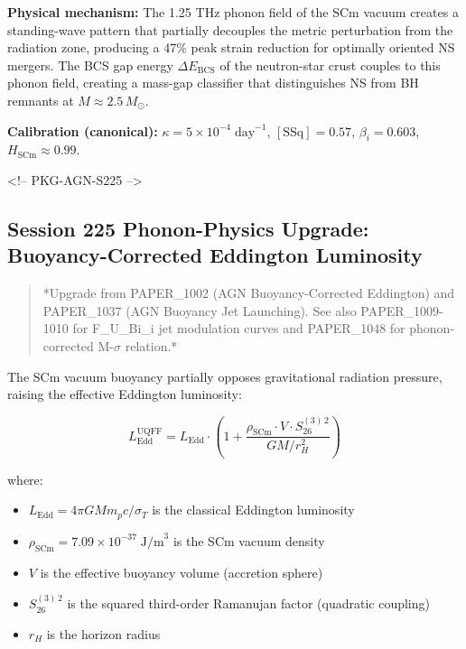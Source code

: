\documentclass[12pt,a4paper]{article}
\begin{document}
\textbf{Physical mechanism:} The 1.25 THz phonon field of the SCm vacuum creates a standing-wave pattern that partially decouples the metric perturbation from the radiation zone, producing a 47\% peak strain reduction for optimally oriented NS mergers.  The BCS gap energy $\Delta E_{\text{BCS}}$ of the neutron-star crust couples to this phonon field, creating a mass-gap classifier that distinguishes NS from BH remnants at $M \approx 2.5\,M_\odot$.

\textbf{Calibration (canonical):} $\kappa = 5 \times 10^{-4}\;\text{day}^{-1}$, $[\text{SSq}] = 0.57$, $\beta_i = 0.603$, $H_{\text{SCm}} \approx 0.99$.

<!-- PKG-AGN-S225 -->

\subsection{Session 225 Phonon-Physics Upgrade: Buoyancy-Corrected Eddington Luminosity}

\begin{quote}
*Upgrade from PAPER\_1002 (AGN Buoyancy-Corrected Eddington) and PAPER\_1037
(AGN Buoyancy Jet Launching).  See also PAPER\_1009-1010 for F\_{U\_Bi\_i} jet
modulation curves and PAPER\_1048 for phonon-corrected M-$\sigma$ relation.*
\end{quote}

The SCm vacuum buoyancy partially opposes gravitational radiation pressure, raising the effective Eddington luminosity:

\begin{equation}
L_{\text{Edd}}^{\text{UQFF}} = L_{\text{Edd}} \cdot \left(1 + \frac{\rho_{\text{SCm}} \cdot V \cdot S_{26}^{(3)\,2}}{G M / r_H^2}\right)
\end{equation}

where:

\begin{itemize}
  \item $L_{\text{Edd}} = 4\pi G M m_p c / \sigma_T$ is the classical Eddington luminosity
  \item $\rho_{\text{SCm}} = 7.09 \times 10^{-37}\;\text{J/m}^3$ is the SCm vacuum density
  \item $V$ is the effective buoyancy volume (accretion sphere)
  \item $S_{26}^{(3)\,2}$ is the squared third-order Ramanujan factor (quadratic coupling)
  \item $r_H$ is the horizon radius
\end{itemize}
\end{document}
